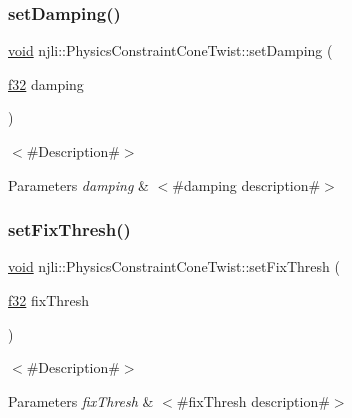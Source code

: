 \subsubsection{\texorpdfstring{set\+Damping()}{setDamping()}}
{\footnotesize\ttfamily \mbox{\hyperlink{_thread_8h_af1e856da2e658414cb2456cb6f7ebc66}{void}} njli\+::\+Physics\+Constraint\+Cone\+Twist\+::set\+Damping (\begin{DoxyParamCaption}\item[{\mbox{\hyperlink{_util_8h_a5f6906312a689f27d70e9d086649d3fd}{f32}}}]{damping }\end{DoxyParamCaption})}

$<$\#\+Description\#$>$


\begin{DoxyParams}{Parameters}
{\em damping} & $<$\#damping description\#$>$ \\
\hline
\end{DoxyParams}
\mbox{\label{classnjli_1_1_physics_constraint_cone_twist_a0bfeee1933ef308fc523f58421dcb9a2}} 
\subsubsection{\texorpdfstring{set\+Fix\+Thresh()}{setFixThresh()}}
{\footnotesize\ttfamily \mbox{\hyperlink{_thread_8h_af1e856da2e658414cb2456cb6f7ebc66}{void}} njli\+::\+Physics\+Constraint\+Cone\+Twist\+::set\+Fix\+Thresh (\begin{DoxyParamCaption}\item[{\mbox{\hyperlink{_util_8h_a5f6906312a689f27d70e9d086649d3fd}{f32}}}]{fix\+Thresh }\end{DoxyParamCaption})}

$<$\#\+Description\#$>$


\begin{DoxyParams}{Parameters}
{\em fix\+Thresh} & $<$\#fix\+Thresh description\#$>$ \\
\hline
\end{DoxyParams}
\mbox{\label{classnjli_1_1_physics_constraint_cone_twist_a8bbcee31a07d672830c0079e8559fde4}} 
